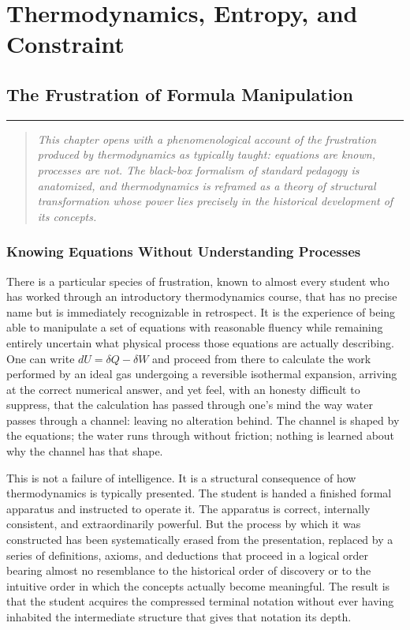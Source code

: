 \documentclass[12pt,openany]{book}
\theoremstyle{plain}
\theoremstyle{definition}
\theoremstyle{remark}
\newcommand{\chapterrule}{%
  \vspace{4pt}%
  {\color{SpherepopBlue}\rule{\textwidth}{0.8pt}}%
  \vspace{10pt}%
}
\newenvironment{chapterprecis}{%
  \begin{quote}\small\itshape}{%
  \end{quote}\medskip}
\begin{document}
 \clearpage

\part{Thermodynamics, Entropy, and Constraint}

\chapter{The Frustration of Formula Manipulation}
\chapterrule

\begin{chapterprecis}
This chapter opens with a phenomenological account of the
frustration produced by thermodynamics as typically taught:
equations are known, processes are not. The black-box formalism
of standard pedagogy is anatomized, and thermodynamics is
reframed as a theory of structural transformation whose power
lies precisely in the historical development of its concepts.
\end{chapterprecis}

\section{Knowing Equations Without Understanding Processes}

There is a particular species of frustration, known to almost every student who has worked through an introductory thermodynamics course, that has no precise name but is immediately recognizable in retrospect. It is the experience of being able to manipulate a set of equations with reasonable fluency while remaining entirely uncertain what physical process those equations are actually describing. One can write $dU = \delta Q - \delta W$ and proceed from there to calculate the work performed by an ideal gas undergoing a reversible isothermal expansion, arriving at the correct numerical answer, and yet feel, with an honesty difficult to suppress, that the calculation has passed through one's mind the way water passes through a channel: leaving no alteration behind. The channel is shaped by the equations; the water runs through without friction; nothing is learned about why the channel has that shape.

This is not a failure of intelligence. It is a structural consequence of how thermodynamics is typically presented. The student is handed a finished formal apparatus and instructed to operate it. The apparatus is correct, internally consistent, and extraordinarily powerful. But the process by which it was constructed has been systematically erased from the presentation, replaced by a series of definitions, axioms, and deductions that proceed in a logical order bearing almost no resemblance to the historical order of discovery or to the intuitive order in which the concepts actually become meaningful. The result is that the student acquires the compressed terminal notation without ever having inhabited the intermediate structure that gives that notation its depth.
\end{document}
